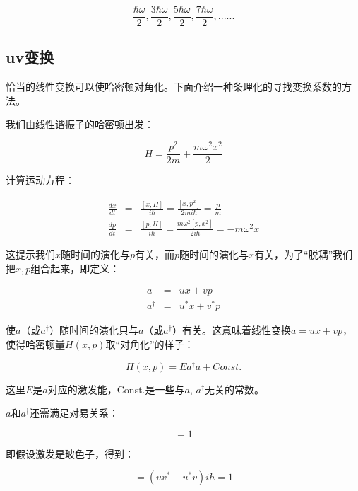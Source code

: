\begin{equation*}
\frac{\hbar \omega}{2}, \frac{3 \hbar \omega}{2}, \frac{5 \hbar \omega}{2}, \frac{7 \hbar \omega}{2}, ......
\end{equation*}

\subsection{uv变换}

恰当的线性变换可以使哈密顿对角化。下面介绍一种条理化的寻找变换系数的方法。

我们由线性谐振子的哈密顿出发：

\begin{equation*}
   H=\frac{p^2}{2m}+\frac{m\omega^2 x^2}{2}
\end{equation*}

计算运动方程：

\begin{eqnarray}
\frac{dx}{dt} &=& \frac{[x,H]}{i\hbar}=\frac{[x,p^2]}{2mi\hbar}=\frac{p}{m} \\
\frac{dp}{dt} &=& \frac{[p,H]}{i\hbar}=\frac{m \omega^2 [p,x^2]}{2i\hbar}=- m\omega^2x
\end{eqnarray}


这提示我们$x$随时间的演化与$p$有关，而$p$随时间的演化与$x$有关，为了“脱耦”我们把$x,p$组合起来，即定义：

\begin{eqnarray}
a &=& ux +vp \\
a^\dagger &=& u^* x + v^* p
\end{eqnarray}

使$a$（或$a^\dagger$）随时间的演化只与$a$（或$a^\dagger$）有关。这意味着线性变换$a = u x + v p$，使得哈密顿量$H(x, p )$取“对角化”的样子：

\begin{equation*}
H(x, p) = E a^\dagger a + Const.
\end{equation*}

这里$E$是$a$对应的激发能，Const.是一些与$a$, $a^\dagger$无关的常数。

$a$和$a^\dagger$还需满足对易关系：

\begin{equation}
[a, a^\dagger ]=1
\end{equation}

即假设激发是玻色子，得到：

\begin{equation}
[ux+vp,u^*x + v^*p] = (uv^*-u^*v)i\hbar=1
\end{equation}

